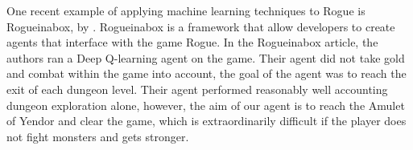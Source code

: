 \documentclass[11pt,a4paper]{article}
\begin{document}
One recent example of applying machine learning techniques to Rogue is Rogueinabox, by \cite{asperti17}. Rogueinabox is a framework that allow developers to create agents that interface with the game Rogue. In the Rogueinabox article, the authors ran a Deep Q-learning agent on the game. Their agent did not take gold and combat within the game into account, the goal of the agent was to reach the exit of each dungeon level. Their agent performed reasonably well accounting dungeon exploration alone, however, the aim of our agent is to reach the Amulet of Yendor and clear the game, which is extraordinarily difficult if the player does not fight monsters and gets stronger.



\end{document}

